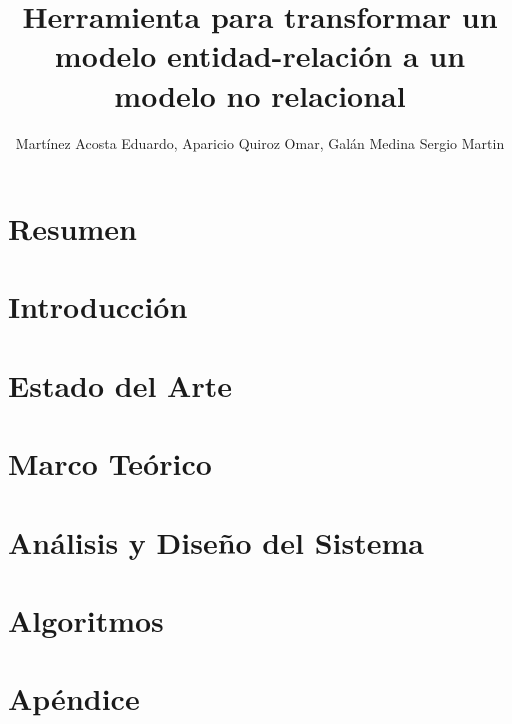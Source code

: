 \documentclass[12pt, a4paper]{report}
\title{Herramienta para transformar un modelo entidad-relación a un modelo no relacional}
\author{Martínez Acosta Eduardo, Aparicio Quiroz Omar, Galán Medina Sergio Martin}
\begin{document}


\tableofcontents
\listoffigures
\listoftables

\chapter*{Resumen}
\chapter{Introducción}

\chapter{Estado del Arte}

\chapter{Marco Teórico}

\chapter{Análisis y Diseño del Sistema}

\chapter{Algoritmos}

% 
\appendix
\chapter{Apéndice}
 
 

\printbibliography
\end{document}
